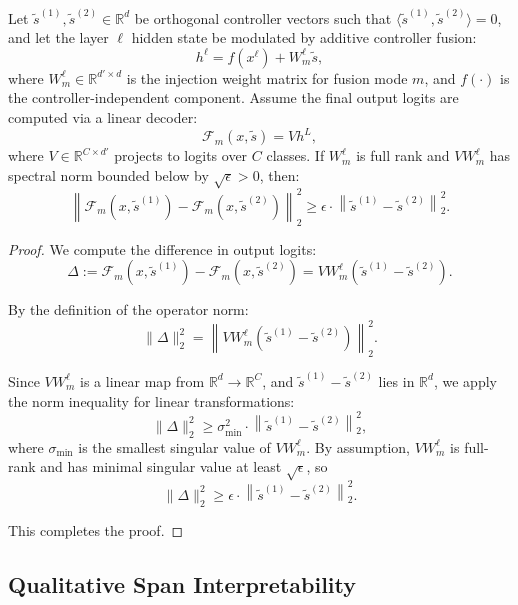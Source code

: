 \begin{proposition}
\label{prop:orthogonal_fusion}
Let \(\tilde{s}^{(1)}, \tilde{s}^{(2)} \in \mathbb{R}^d\) be orthogonal controller vectors such that \(\langle \tilde{s}^{(1)}, \tilde{s}^{(2)} \rangle = 0\), and let the layer \(\ell\) hidden state be modulated by additive controller fusion:
\[
h^\ell = f(x^\ell) + W_m^\ell \tilde{s},
\]
where \(W_m^\ell \in \mathbb{R}^{d' \times d}\) is the injection weight matrix for fusion mode \(m\), and \(f(\cdot)\) is the controller-independent component. Assume the final output logits are computed via a linear decoder:
\[
\mathcal{F}_m(x, \tilde{s}) = V h^L,
\]
where \(V \in \mathbb{R}^{C \times d'}\) projects to logits over \(C\) classes. If \(W_m^\ell\) is full rank and \(V W_m^\ell\) has spectral norm bounded below by \(\sqrt{\epsilon} > 0\), then:
\[
\left\| \mathcal{F}_m(x, \tilde{s}^{(1)}) - \mathcal{F}_m(x, \tilde{s}^{(2)}) \right\|_2^2 \geq \epsilon \cdot \left\| \tilde{s}^{(1)} - \tilde{s}^{(2)} \right\|_2^2.
\]
\end{proposition}

\begin{proof}
We compute the difference in output logits:
\[
\Delta := \mathcal{F}_m(x, \tilde{s}^{(1)}) - \mathcal{F}_m(x, \tilde{s}^{(2)}) = V W_m^\ell (\tilde{s}^{(1)} - \tilde{s}^{(2)}).
\]

By the definition of the operator norm:
\[
\|\Delta\|_2^2 = \left\| V W_m^\ell (\tilde{s}^{(1)} - \tilde{s}^{(2)}) \right\|_2^2.
\]

Since \(V W_m^\ell\) is a linear map from \(\mathbb{R}^d \to \mathbb{R}^C\), and \(\tilde{s}^{(1)} - \tilde{s}^{(2)}\) lies in \(\mathbb{R}^d\), we apply the norm inequality for linear transformations:
\[
\| \Delta \|_2^2 \geq \sigma_{\min}^2 \cdot \left\| \tilde{s}^{(1)} - \tilde{s}^{(2)} \right\|_2^2,
\]
where \(\sigma_{\min}\) is the smallest singular value of \(V W_m^\ell\). By assumption, \(V W_m^\ell\) is full-rank and has minimal singular value at least \(\sqrt{\epsilon}\), so
\[
\| \Delta \|_2^2 \geq \epsilon \cdot \left\| \tilde{s}^{(1)} - \tilde{s}^{(2)} \right\|_2^2.
\]

This completes the proof.
\end{proof}












\subsection{Qualitative Span Interpretability}
\label{sec:qualitative-spans}

